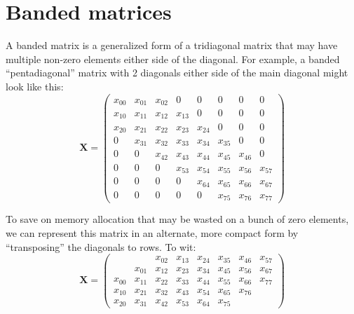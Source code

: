 \documentclass{article}
\begin{document}
\section{Banded matrices}

A banded matrix is a generalized form of a tridiagonal matrix that may have multiple non-zero elements either side of the diagonal. For example, a banded ``pentadiagonal'' matrix with 2 diagonals either side of the main diagonal might look like this:
\begin{equation}
  \mathbf{X} =
  \begin{pmatrix}
    x_{00} & x_{01} & x_{02} & 0      & 0      & 0      & 0      & 0      \\
    x_{10} & x_{11} & x_{12} & x_{13} & 0      & 0      & 0      & 0      \\
    x_{20} & x_{21} & x_{22} & x_{23} & x_{24} & 0      & 0      & 0      \\
    0      & x_{31} & x_{32} & x_{33} & x_{34} & x_{35} & 0      & 0      \\
    0      & 0      & x_{42} & x_{43} & x_{44} & x_{45} & x_{46} & 0      \\
    0      & 0      & 0      & x_{53} & x_{54} & x_{55} & x_{56} & x_{57} \\
    0      & 0      & 0      & 0      & x_{64} & x_{65} & x_{66} & x_{67} \\
    0      & 0      & 0      & 0      & 0      & x_{75} & x_{76} & x_{77}
  \end{pmatrix}
\end{equation}

To save on memory allocation that may be wasted on a bunch of zero elements, we can represent this matrix in an alternate, more compact form by ``transposing'' the diagonals to rows. To wit:
\begin{equation}
  \mathbf{X} =
  \begin{pmatrix}
           &        & x_{02} & x_{13} & x_{24} & x_{35} & x_{46} & x_{57} \\
           & x_{01} & x_{12} & x_{23} & x_{34} & x_{45} & x_{56} & x_{67} \\
    x_{00} & x_{11} & x_{22} & x_{33} & x_{44} & x_{55} & x_{66} & x_{77} \\
    x_{10} & x_{21} & x_{32} & x_{43} & x_{54} & x_{65} & x_{76} &        \\
    x_{20} & x_{31} & x_{42} & x_{53} & x_{64} & x_{75} &        &        
  \end{pmatrix}
\end{equation}
\end{document}
